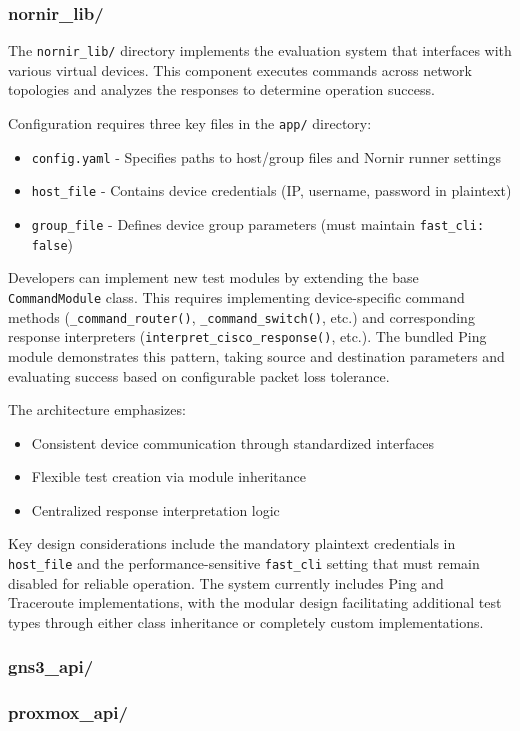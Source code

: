    \subsubsection{nornir\_lib/}

        The \texttt{nornir\_lib/} directory implements the evaluation system that interfaces with various virtual devices. 
        This component executes commands across network topologies and analyzes the responses to determine operation 
        success.

        Configuration requires three key files in the \texttt{app/} directory:
        \begin{itemize}
            \item \texttt{config.yaml} - Specifies paths to host/group files and Nornir runner settings
            \item \texttt{host\_file} - Contains device credentials (IP, username, password in plaintext)
            \item \texttt{group\_file} - Defines device group parameters (must maintain \texttt{fast\_cli: false})
        \end{itemize}

        Developers can implement new test modules by extending the base \texttt{CommandModule} class. This requires 
        implementing device-specific command methods (\texttt{\_command\_router()}, \texttt{\_command\_switch()}, etc.) 
        and corresponding response interpreters (\texttt{interpret\_cisco\_response()}, etc.). The bundled Ping module 
        demonstrates this pattern, taking source and destination parameters and evaluating success based on 
        configurable packet loss tolerance.

        The architecture emphasizes:
        \begin{itemize}
            \item Consistent device communication through standardized interfaces
            \item Flexible test creation via module inheritance
            \item Centralized response interpretation logic
        \end{itemize}

        Key design considerations include the mandatory plaintext credentials in \texttt{host\_file} and the 
        performance-sensitive \texttt{fast\_cli} setting that must remain disabled for reliable operation. The 
        system currently includes Ping and Traceroute implementations, with the modular design facilitating 
        additional test types through either class inheritance or completely custom implementations.

    \subsubsection{gns3\_api/}

    \subsubsection{proxmox\_api/}